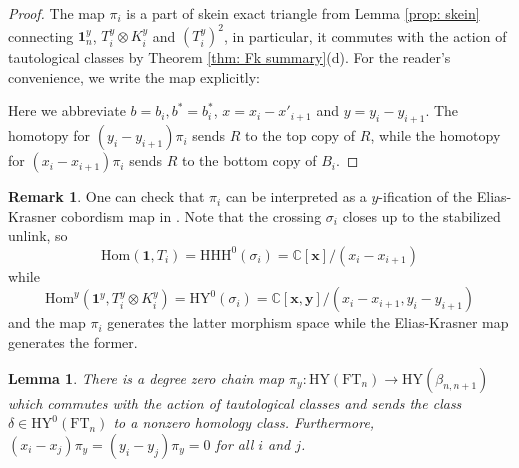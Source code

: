 \documentclass{amsart}
\newcommand{\C}{\mathbb{C}}
\newcommand{\xx}{\mathbf{x}}
\newcommand{\yy}{\mathbf{y}}
\newcommand{\FT}{\mathrm{FT}}
\newcommand{\HY}{\mathrm{HY}}
\newcommand{\one}{\mathbf{1}}
\newcommand{\HHH}{\mathrm{HHH}}
\newcommand{\Hom}{\mathrm{Hom}}
\numberwithin{equation}{section}
\newtheorem{lemma}[theorem]{Lemma}
\theoremstyle{definition}
\newtheorem{remark}[theorem]{Remark}
\begin{document}
\begin{proof}
The map $\pi_i$ is a part of skein exact triangle from Lemma \ref{prop: skein} connecting $\one_n^y$, $T_i^y\otimes K_i^y$ and $(T_i^y)^2$, in particular, it commutes with the action of tautological classes by Theorem \ref{thm: Fk summary}(d). For the reader's convenience, we write the map explicitly:

\begin{center}
\end{center}
Here we abbreviate $b=b_i,b^*=b_i^*$, $x=x_i-x'_{i+1}$ and $y=y_i-y_{i+1}$. 
The homotopy for $(y_i-y_{i+1})\pi_i$ sends $R$ to the top copy of $R$, while the homotopy for $(x_i-x_{i+1})\pi_i$ sends $R$ to the bottom copy of $B_i$.
\end{proof}

\begin{remark}
One can check that $\pi_i$ can be interpreted as a $y$-ification of the Elias-Krasner cobordism map in \cite{EK}. Note that the crossing $\sigma_i$ closes up to the stabilized unlink, so
$$
\Hom(\one,T_i)=\HHH^0(\sigma_i)=\C[\xx]/(x_i-x_{i+1})
$$
while
$$
\Hom^y(\one^y,T_i^y\otimes K_i^y)=\HY^0(\sigma_i)=\C[\xx,\yy]/(x_i-x_{i+1},y_i-y_{i+1})
$$
and the map $\pi_i$ generates the latter morphism space while the Elias-Krasner map generates the former.
\end{remark}


\begin{lemma}
\label{lem: pi}
There is a degree zero chain map $\pi_y:\HY(\FT_n)\to \HY(\beta_{n,n+1})$  which commutes with the action of tautological classes and sends the class $\delta\in \HY^0(\FT_n)$ to a nonzero homology class. Furthermore,
$(x_i-x_j)\pi_y=(y_i-y_j)\pi_y=0$ for all $i$ and $j$.
\end{lemma}
\end{document}
